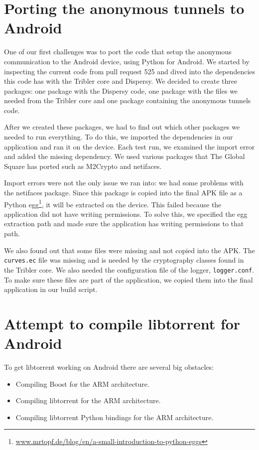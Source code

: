 	\section{Porting the anonymous tunnels to Android}
		One of our first challenges was to port the code that setup the anonymous communication to the Android device, using Python for Android. We started by inspecting the current code from pull request 525 and dived into the dependencies this code has with the Tribler core and Dispersy. We decided to create three packages: one package with the Dispersy code, one package with the files we needed from the Tribler core and one package containing the anonymous tunnels code.
		
		After we created these packages, we had to find out which other packages we needed to run everything. To do this, we imported the dependencies in our application and ran it on the device. Each test run, we examined the import error and added the missing dependency. We used various packages that The Global Square has ported such as M2Crypto and netifaces.
		
		Import errors were not the only issue we ran into: we had some problems with the netifaces package. Since this package is copied into the final APK file as a Python egg\footnote{\href{http://mrtopf.de/blog/en/a-small-introduction-to-python-eggs/}{www.mrtopf.de/blog/en/a-small-introduction-to-python-eggs}}, it will be extracted on the device. This failed because the application did not have writing permissions. To solve this, we specified the egg extraction path and made sure the application has writing permissions to that path.
		
		We also found out that some files were missing and not copied into the APK. The \texttt{curves.ec} file was missing and is needed by the cryptography classes found in the Tribler core. We also needed the configuration file of the logger, \texttt{logger.conf}. To make sure these files are part of the application, we copied them into the final application in our build script.
		
	\section{Attempt to compile libtorrent for Android}
		To get libtorrent working on Android there are several big obstacles:
		\begin{itemize}
			\item Compiling Boost for the ARM architecture.
			\item Compiling libtorrent for the ARM architecture.
			\item Compiling libtorrent Python bindings for the ARM architecture.
		\end{itemize}
		
